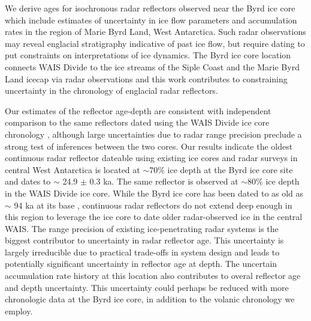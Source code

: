 

We derive ages for isochronous radar reflectors observed near the Byrd ice core which include estimates of uncertainty in ice flow parameters and accumulation rates in the region of Marie Byrd Land, West Antarctica. Such radar observations may reveal englacial stratigraphy indicative of past ice flow, but require dating to put constraints on interpretations of ice dynamics. The Byrd ice core location connects WAIS Divide to the ice streams of the Siple Coast and the Marie Byrd Land icecap via radar observations and this work contributes to constraining uncertainty in the chronology of englacial radar reflectors.

Our estimates of the reflector age-depth are consistent with independent comparison to the same reflectors dated using the WAIS Divide ice core chronology \citep{buizert2015}, although large uncertainties due to radar range precision preclude a strong test of inferences between the two cores. Our results indicate the oldest continuous radar reflector dateable using existing ice cores and radar surveys in central West Antarctica is located at $\sim$70\% ice depth at the Byrd ice core site and dates to $\sim$ 24.9 $\pm$ 0.3 ka. The same reflector is observed at $\sim$80\% ice depth in the WAIS Divide ice core. While the Byrd ice core has been dated to as old as $\sim$ 94 ka at its base \citep{blunier2001}, continuous radar reflectors do not extend deep enough in this region to leverage the ice core to date older radar-observed ice in the central WAIS. The range precision of existing ice-penetrating radar systems is the biggest contributor to uncertainty in radar reflector age. This uncertainty is largely irreducible due to practical trade-offs in system design and leads to potentially significant uncertainty in reflector age at depth. The uncertain accumulation rate history at this location also contributes to overal reflector age and depth uncertainty. This uncertainty could perhaps be reduced with more chronologic data at the Byrd ice core, in addition to the volanic chronology we employ. 








